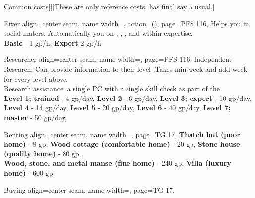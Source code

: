 \begin{PageBack}
\begin{Tables}{\backTableHeight}
\begin{Table}{Common costs}[][These are only reference costs. \GM has final say a usual.]
\begin{entry}{Fixer }{%
                align=center seam,
                name width=\turnLength,%
                action={\BodyFont ()},
                page=PFS 116,
            }
                Helps you in social maters.\hfill
                Automatically  you on , , ,
                and  within expertise.\\
                \textbf{Basic} - 1 gp/h, \quad
                \textbf{Expert}  2 gp/h 
            \end{entry}
            \begin{entry}{Researcher}{%
                align=center seam,
                name width=\turnLength,%
                page=PFS 116,
            }
                Independent Research: Can provide information to their level .\hfill Takes min 
                week and add  week for every level above.\\
                Research assistance:  a single PC with a single skill check as part of the \hfill{}\\
                \textbf{Level 1; trained} - 4 gp/day,\quad
                \textbf{Level 2} - 6 gp/day,\quad
                \textbf{Level 3; expert} - 10 gp/day, \hfill{}\\
                \textbf{Level 4} - 14 gp/day,\hspace{-0.73ex}\hphantom{; trained}\quad
                \textbf{Level 5} - 20 gp/day,\hspace{-0.73ex}\quad
                \textbf{Level 6} - 40 gp/day,\quad
                \textbf{Level 7; master} - 50 gp/day, \quad
            \end{entry}
            \breakLine[Housing]
            \begin{entry}{Renting}{%
                align=center seam,
                name width=\turnLength,%
                page=TG 17,
            }
                \textbf{Thatch hut (poor home)} - 8 gp, \hfill
                \textbf{Wood cottage (comfortable home)} - 20 gp, \hfill
                \textbf{Stone house (quality home)} - 80 gp,\\
                \textbf{Wood, stone, and metal manse (fine home)} - 240 gp, \quad
                \textbf{Villa (luxury home) } - 600 gp \hfill{}
            \end{entry}
            \begin{entry}{Buying}{%
                align=center seam,
                name width=\turnLength,%
                page=TG 17,
            }

\end{entry}
\end{Table}
\end{Tables}
\end{PageBack}
